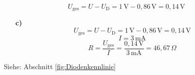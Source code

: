 {\begin{itemize}
        \begin{equation*}
            U_\mathrm{ges} = U - U_\mathrm{D} = 1 \, \mathrm{V} - 0,86 \, \mathrm{V} = 0,14 \, \mathrm{V}
        \end{equation*}


    \end{itemize}



\begin{itemize}
    \item[\bf c)] 
    \[
    U_{\text{ges}} = U - U_\text{D} = 1 \, \text{V} - 0,86 \, \text{V} = 0,14 \, \text{V}
    \]
    \[
    I = 3 \, \text{mA}
    \]
    \[
    R = \frac{U_{\text{ges}}}{I} = \frac{0,14 \, \text{V}}{3 \, \text{mA}} = 46,67 \, \Omega
    \]
\end{itemize}
Siehe: Abschnitt \ref{fig:Diodenkennlinie}








}
